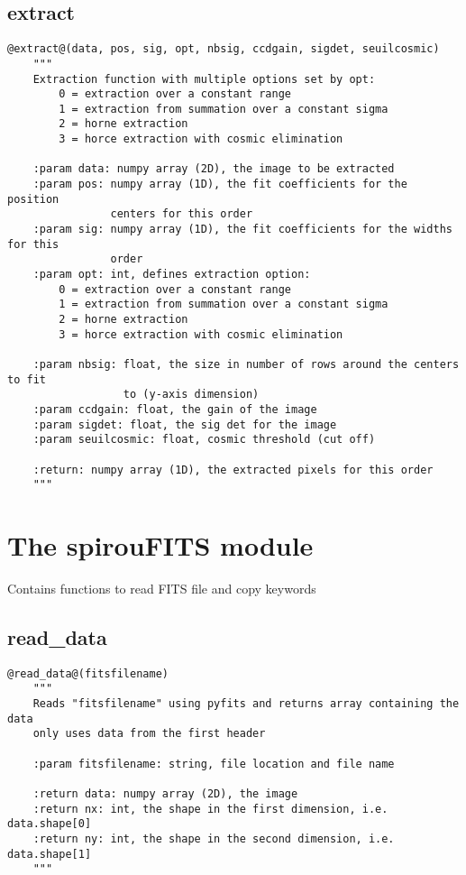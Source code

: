 \subsection{extract}
\begin{lstlisting}[style=pythonstyle]
@extract@(data, pos, sig, opt, nbsig, ccdgain, sigdet, seuilcosmic)
    """
    Extraction function with multiple options set by opt:
        0 = extraction over a constant range
        1 = extraction from summation over a constant sigma
        2 = horne extraction
        3 = horce extraction with cosmic elimination
    
    :param data: numpy array (2D), the image to be extracted
    :param pos: numpy array (1D), the fit coefficients for the position
                centers for this order
    :param sig: numpy array (1D), the fit coefficients for the widths for this
                order
    :param opt: int, defines extraction option:
        0 = extraction over a constant range
        1 = extraction from summation over a constant sigma
        2 = horne extraction
        3 = horce extraction with cosmic elimination
    
    :param nbsig: float, the size in number of rows around the centers to fit
                  to (y-axis dimension)
    :param ccdgain: float, the gain of the image
    :param sigdet: float, the sig det for the image
    :param seuilcosmic: float, cosmic threshold (cut off)
    
    :return: numpy array (1D), the extracted pixels for this order
    """
\end{lstlisting}

\clearpage
\newpage
\section{The spirouFITS module}

Contains functions to read FITS file and copy keywords

\subsection{read\_data}
\begin{lstlisting}[style=pythonstyle]
@read_data@(fitsfilename)
    """
    Reads "fitsfilename" using pyfits and returns array containing the data
    only uses data from the first header

    :param fitsfilename: string, file location and file name

    :return data: numpy array (2D), the image
    :return nx: int, the shape in the first dimension, i.e. data.shape[0]
    :return ny: int, the shape in the second dimension, i.e. data.shape[1]
    """
\end{lstlisting}

